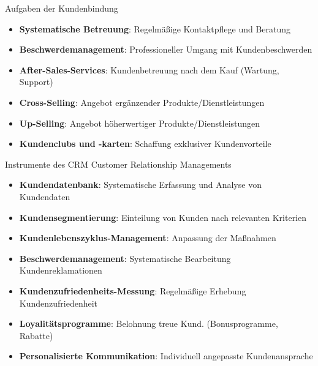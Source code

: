 \small



\begin{definition}{Aufgaben der Kundenbindung}
\begin{itemize}
    \item \textbf{Systematische Betreuung}: Regelmäßige Kontaktpflege und Beratung
    \item \textbf{Beschwerdemanagement}: Professioneller Umgang mit Kundenbeschwerden
    \item \textbf{After-Sales-Services}: Kundenbetreuung nach dem Kauf (Wartung, Support)
    \item \textbf{Cross-Selling}: Angebot ergänzender Produkte/Dienstleistungen
    \item \textbf{Up-Selling}: Angebot höherwertiger Produkte/Dienstleistungen
    \item \textbf{Kundenclubs und -karten}: Schaffung exklusiver Kundenvorteile
\end{itemize}
\end{definition}

\begin{definition}{Instrumente des CRM}
Customer Relationship Managements 
\begin{itemize}
    \item \textbf{Kundendatenbank}: Systematische Erfassung und Analyse von Kundendaten
    \item \textbf{Kundensegmentierung}: Einteilung von Kunden nach relevanten Kriterien
    \item \textbf{Kundenlebenszyklus-Management}: Anpassung der Maßnahmen
    \item \textbf{Beschwerdemanagement}: Systematische Bearbeitung Kundenreklamationen
    \item \textbf{Kundenzufriedenheits-Messung}: Regelmäßige Erhebung Kundenzufriedenheit
    \item \textbf{Loyalitätsprogramme}: Belohnung treue Kund. (Bonusprogramme, Rabatte)
    \item \textbf{Personalisierte Kommunikation}: Individuell angepasste Kundenansprache
\end{itemize}
\end{definition}

